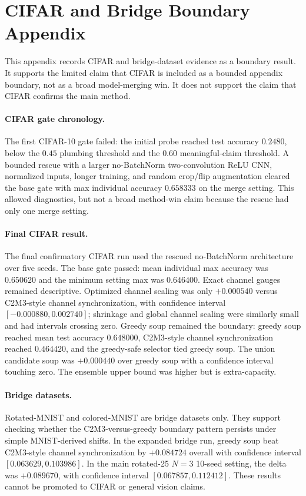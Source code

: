 \section{CIFAR and Bridge Boundary Appendix}
\label{app:cifar-bridge-boundary}

This appendix records CIFAR and bridge-dataset evidence as a boundary result.
It supports the limited claim that CIFAR is included as a bounded appendix
boundary, not as a broad model-merging win.  It does not support the claim that
CIFAR confirms the main method.

\paragraph{CIFAR gate chronology.}
The first CIFAR-10 gate failed: the initial probe reached test accuracy
\(0.2480\), below the \(0.45\) plumbing threshold and the \(0.60\)
meaningful-claim threshold.  A bounded rescue with a larger no-BatchNorm
two-convolution ReLU CNN, normalized inputs, longer training, and random
crop/flip augmentation cleared the base gate with max individual accuracy
\(0.658333\) on the merge setting.  This allowed diagnostics, but not a broad
method-win claim because the rescue had only one merge setting.

\paragraph{Final CIFAR result.}
The final confirmatory CIFAR run used the rescued no-BatchNorm architecture over
five seeds.  The base gate passed: mean individual max accuracy was \(0.650620\)
and the minimum setting max was \(0.646400\).  Exact channel gauges remained
descriptive.  Optimized channel scaling was only \(+0.000540\) versus
C2M3-style channel synchronization, with confidence interval
\([-0.000880,0.002740]\); shrinkage and global channel scaling were similarly
small and had intervals crossing zero.  Greedy soup remained the boundary:
greedy soup reached mean test accuracy \(0.648000\), C2M3-style channel
synchronization reached \(0.464420\), and the greedy-safe selector tied greedy
soup.  The union candidate soup was \(+0.000440\) over greedy soup with a
confidence interval touching zero.  The ensemble upper bound was higher but is
extra-capacity.

\paragraph{Bridge datasets.}
Rotated-MNIST and colored-MNIST are bridge datasets only.  They support checking
whether the C2M3-versus-greedy boundary pattern persists under simple
MNIST-derived shifts.  In the expanded bridge run, greedy soup beat C2M3-style
channel synchronization by \(+0.084724\) overall with confidence interval
\([0.063629,0.103986]\).  In the main rotated-25 \(N=3\) 10-seed setting, the
delta was \(+0.089670\), with confidence interval
\([0.067857,0.112412]\).  These results cannot be promoted to CIFAR or general
vision claims.


